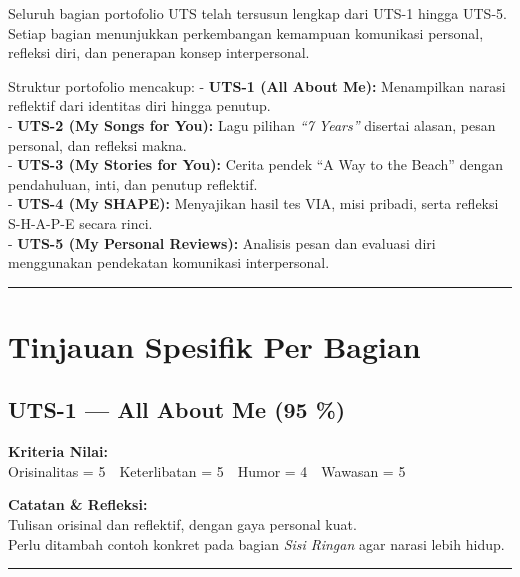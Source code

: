 \documentclass[
  letterpaper,
  DIV=11,
  numbers=noendperiod]{scrreprt}
\begin{document}
Seluruh bagian portofolio UTS telah tersusun lengkap dari UTS-1 hingga
UTS-5.\\
Setiap bagian menunjukkan perkembangan kemampuan komunikasi personal,
refleksi diri, dan penerapan konsep interpersonal.

Struktur portofolio mencakup: - \textbf{UTS-1 (All About Me):}
Menampilkan narasi reflektif dari identitas diri hingga penutup.\\
- \textbf{UTS-2 (My Songs for You):} Lagu pilihan \emph{``7 Years''}
disertai alasan, pesan personal, dan refleksi makna.\\
- \textbf{UTS-3 (My Stories for You):} Cerita pendek ``A Way to the
Beach'' dengan pendahuluan, inti, dan penutup reflektif.\\
- \textbf{UTS-4 (My SHAPE):} Menyajikan hasil tes VIA, misi pribadi,
serta refleksi S-H-A-P-E secara rinci.\\
- \textbf{UTS-5 (My Personal Reviews):} Analisis pesan dan evaluasi diri
menggunakan pendekatan komunikasi interpersonal.

\begin{center}\rule{0.5\linewidth}{0.5pt}\end{center}

\section*{Tinjauan Spesifik Per
Bagian}\label{tinjauan-spesifik-per-bagian}


\subsection*{UTS-1 --- All About Me (95
\%)}\label{uts-1-all-about-me-95}

\textbf{Kriteria Nilai:}\\
Orisinalitas = 5 Keterlibatan = 5 Humor = 4 Wawasan = 5

\textbf{Catatan \& Refleksi:}\\
Tulisan orisinal dan reflektif, dengan gaya personal kuat.\\
Perlu ditambah contoh konkret pada bagian \emph{Sisi Ringan} agar narasi
lebih hidup.

\begin{center}\rule{0.5\linewidth}{0.5pt}\end{center}
\end{document}
